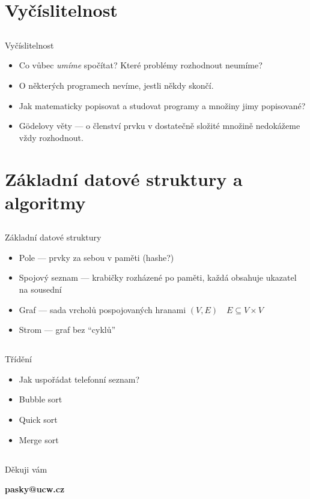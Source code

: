 \documentclass{beamer}
\begin{document}
\section{Vyčíslitelnost}

\subsection{}
\begin{frame}{Vyčíslitelnost}
\begin{itemize}
\item Co vůbec {\em umíme} spočítat? Které problémy rozhodnout neumíme?
\item O některých programech nevíme, jestli někdy skončí.
\item Jak matematicky popisovat a studovat programy a množiny jimy popisované?
\item Gödelovy věty --- o členství prvku v dostatečně složité množině nedokážeme vždy rozhodnout.
\end{itemize}
\end{frame}

\section{Základní datové struktury a algoritmy}

\subsection{}
\begin{frame}{Základní datové struktury}
\begin{itemize}
\item Pole --- prvky za sebou v paměti (hashe?)
\item Spojový seznam --- krabičky rozházené po paměti, každá obsahuje ukazatel na sousední
\item Graf --- sada vrcholů pospojovaných hranami $(V,E)\quad E \subseteq V\times V$
\item Strom --- graf bez ``cyklů''
\end{itemize}
\end{frame}

\subsection{}
\begin{frame}{Třídění}
\begin{itemize}
\item Jak uspořádat telefonní seznam?
\item Bubble sort
\item Quick sort
\item Merge sort
\end{itemize}
\end{frame}

\subsection{}
\begin{frame}{Děkuji vám}
\begin{center}
{\bf pasky@ucw.cz}
\end{center}
\end{frame}
\end{document}
